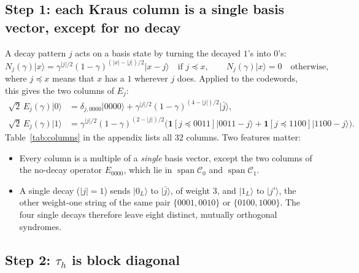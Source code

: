 \documentclass[11pt,a4paper]{article}
\theoremstyle{plain}
\newcommand{\ket}[1]{\lvert #1\rangle}
\newcommand{\cC}{\mathcal{C}}
\newcommand{\wt}[1]{\lvert #1\rvert}
\newcommand{\one}{\mathbf{1}}
\begin{document}
\subsection*{Step 1: each Kraus column is a single basis vector, except for no decay}

A decay pattern $j$ acts on a basis state by turning the decayed $1$'s into $0$'s:
\[
N_j(\gamma)\ket x=\gamma^{\wt{j}/2}(1-\gamma)^{(\wt{x}-\wt{j})/2}\ket{x-j}\quad\text{if } j\preceq x,\qquad N_j(\gamma)\ket x=0\quad\text{otherwise},
\]
where $j\preceq x$ means that $x$ has a $1$ wherever $j$ does. Applied to the codewords, this gives the two columns of $E_j$:
\begin{align}
\sqrt2\,E_j(\gamma)\ket0&=\delta_{j,0000}\ket{0000}+\gamma^{\wt{j}/2}(1-\gamma)^{(4-\wt{j})/2}\ket{\bar j},\label{eq:col0}\\
\sqrt2\,E_j(\gamma)\ket1&=\gamma^{\wt{j}/2}(1-\gamma)^{(2-\wt{j})/2}\big(\one[j\preceq0011]\ket{0011-j}+\one[j\preceq1100]\ket{1100-j}\big).\label{eq:col1}
\end{align}
Table~\ref{tab:columns} in the appendix lists all $32$ columns. Two features matter:
\begin{itemize}
  \item Every column is a multiple of a \emph{single} basis vector, except the two columns of the no-decay operator $E_{0000}$, which lie in $\operatorname{span}\cC_0$ and $\operatorname{span}\cC_1$.
  \item A single decay ($\wt{j}=1$) sends $\ket{0_L}$ to $\ket{\bar j}$, of weight $3$, and $\ket{1_L}$ to $\ket{j'}$, the other weight-one string of the same pair $\{0001,0010\}$ or $\{0100,1000\}$. The four single decays therefore leave eight distinct, mutually orthogonal syndromes.
\end{itemize}

\subsection*{Step 2: \texorpdfstring{$\tau_h$}{tau\_h} is block diagonal}
\end{document}
